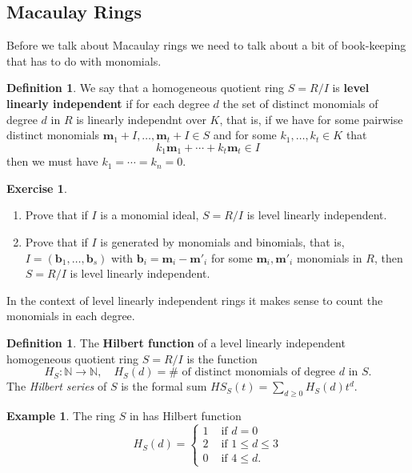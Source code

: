\documentclass[11pt]{amsart}
\newcommand{\N}{{\mathbb N}}
\newcommand{\bb}{{\mathbf b}}
\def\bm{\mathbf{m}}
\theoremstyle{plain} %
\theoremstyle{definition}
\newtheorem{defn}[thm]{Definition}
\newtheorem{ex}[thm]{Example}
\newtheorem{exer}[thm]{Exercise}
\theoremstyle{remark}
\numberwithin{equation}{section}  %
\begin{document}
\subsection{Macaulay Rings}

Before we talk about Macaulay rings we need to talk about a bit of book-keeping that has to do with monomials.

\begin{tcolorbox}
\begin{defn}
We say that a homogeneous quotient ring $S=R/I$ is {\bf level linearly independent} if for each degree $d$ the set of distinct monomials of degree $d$ in $R$ is linearly independnt over $K$, that is,  if  we have for some pairwise distinct monomials $\bm_1+I,\ldots, \bm_t+I\in S$ and  for some $k_1,\ldots, k_t\in K$ that
\[
k_1\bm_1 +\cdots+k_t \bm_t \in I 
\]
then we must have $k_1=\cdots =k_n=0$.
\end{defn}
\end{tcolorbox}

\begin{tcolorbox}[reset]
\begin{exer}
\begin{enumerate}
\item Prove that if $I$ is a monomial ideal, $S=R/I$ is level linearly independent.
\item Prove that if $I$ is generated by monomials and binomials, that is,  $I=(\bb_1, \ldots, \bb_s)$ with $\bb_i=\bm_i-\bm'_i$ for some $\bm_i,\bm'_i$ monomials in $R$,  then $S=R/I$ is level linearly independent.
\end{enumerate}
\end{exer}
\end{tcolorbox}


In the context of level linearly independent rings it makes sense to count the monomials in each degree.
\begin{tcolorbox}
\begin{defn}
The {\bf Hilbert function} of a level linearly independent homogeneous quotient ring $S=R/I$ is the function
\[
H_S:\N\to \N, \quad H_S(d)=\# \text{ of distinct monomials of degree } d \text{ in } S.
\]
The {\em Hilbert series} of $S$ is the formal sum $HS_S(t)=\sum_{d\geq 0} H_S(d)t^d$.
\end{defn}
\end{tcolorbox}

\begin{ex}
The ring $S$ in  has Hilbert function 
\[
H_S(d)=\begin{cases}
1 & \text{ if } d=0\\
2 & \text{ if } 1\leq d\leq 3\\
0 & \text{ if } 4\leq d.
\end{cases}
\]
\end{ex}
\end{document}
